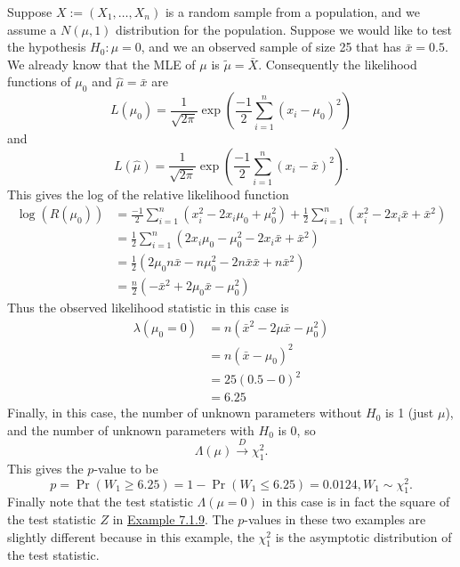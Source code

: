 \documentclass[11pt,fleqn]{book} %
\begin{document}
\begin{example} \label{eg:724}
Suppose \(X := (X_1, \ldots, X_n)\) is a random sample from a population, and we assume a \(N(\mu, 1)\) distribution for the population. Suppose we would like to test the hypothesis \(H_0: \mu = 0\), and we an observed sample of size 25 that has \(\bar{x} = 0.5\). \\
\indent We already know that the MLE of \(\mu\) is \(\tilde{\mu} = \bar{X}\). Consequently the likelihood functions of \(\mu_0\) and \(\hat{\mu} = \bar{x}\) are
\[
L(\mu_0) = \frac{1}{\sqrt{2\pi}}\exp\left(\frac{-1}{2}\sum_{i=1}^n(x_i - \mu_0)^2\right)
\]
and
\[
L(\hat{\mu}) = \frac{1}{\sqrt{2\pi}}\exp\left(\frac{-1}{2}\sum_{i=1}^n(x_i - \bar{x})^2\right).
\]
\indent This gives the log of the relative likelihood function
\[
\begin{aligned}
\log(R(\mu_0)) &= \frac{-1}{2}\sum_{i=1}^n(x_i^2 - 2x_i\mu_0 + \mu_0^2) + \frac12\sum_{i=1}^n(x_i^2 - 2x_i\bar{x} + \bar{x}^2) \\
&= \frac12\sum_{i=1}^n(2x_i\mu_0 - \mu_0^2 - 2x_i\bar{x} + \bar{x}^2) \\
&= \frac12(2\mu_0 n\bar{x} - n\mu_0^2 - 2n\bar{x}\bar{x} + n\bar{x}^2) \\
&= \frac{n}{2}(-\bar{x}^2 + 2\mu_0\bar{x} - \mu_0^2)
\end{aligned}
\]
\indent Thus the observed likelihood statistic in this case is
\[
\begin{aligned}
\lambda(\mu_0 = 0) &= n(\bar{x}^2 - 2\mu\bar{x} - \mu_0^2) \\
&= n(\bar{x} - \mu_0)^2 \\
&= 25(0.5 - 0)^2 \\
&= 6.25
\end{aligned}
\]
\indent Finally, in this case, the number of unknown parameters without \(H_0\) is 1 (just \(\mu\)), and the number of unknown parameters with \(H_0\) is 0, so
\[
\Lambda(\mu) \xrightarrow{D} \chi^2_1.
\]
\indent This gives the \(p\)-value to be
\[
p = \Pr(W_1 \geq 6.25) = 1 - \Pr(W_1 \leq 6.25) = 0.0124, W_1 \sim \chi^2_1.
\]
\indent Finally note that the test statistic \(\Lambda(\mu = 0)\) in this case is in fact the square of the test statistic \(Z\) in \hyperref[eg:719]{Example 7.1.9}. The \(p\)-values in these two examples are slightly different because in this example, the \(\chi^2_1\) is the asymptotic distribution of the test statistic.
\end{example}
\end{document}
